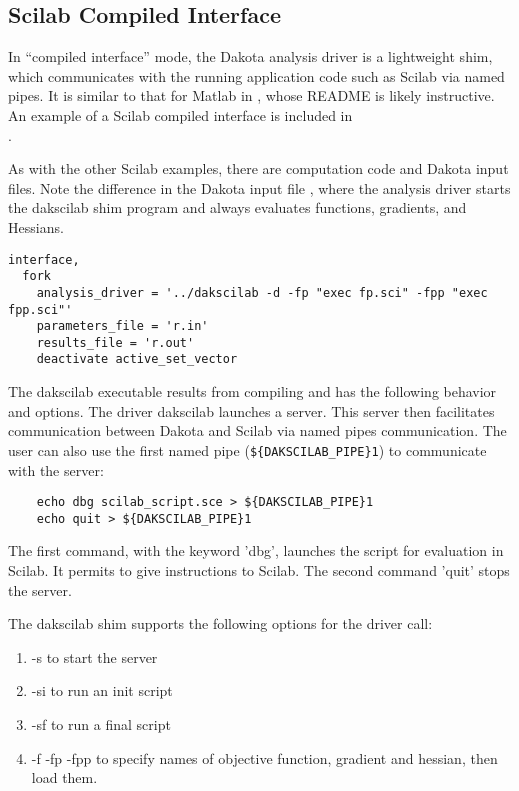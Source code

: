 \subsection{Scilab Compiled Interface} 

In ``compiled interface'' mode, the Dakota analysis driver is a
lightweight shim, which communicates with the running application code
such as Scilab via named pipes. It is similar to that for Matlab in
, whose README is likely
instructive. An example of a Scilab compiled interface is included in \\
.

As with the other Scilab examples, there are computation code and
Dakota input files. Note the difference in the Dakota input file
, where the analysis driver starts the dakscilab
shim program and always evaluates functions, gradients, and Hessians.

\begin{small}
\begin{verbatim}
interface,
  fork
    analysis_driver = '../dakscilab -d -fp "exec fp.sci" -fpp "exec fpp.sci"'
    parameters_file = 'r.in'
    results_file = 'r.out'
    deactivate active_set_vector
\end{verbatim} 
\end{small}

The dakscilab executable results from compiling 
and has the following behavior and options. The driver dakscilab
launches a server. This server then facilitates communication between
Dakota and Scilab via named pipes communication. The user can also use
the first named pipe (\texttt{\$\{DAKSCILAB\_PIPE\}1}) to communicate
with the server:
\begin{small}
\begin{verbatim}
    echo dbg scilab_script.sce > ${DAKSCILAB_PIPE}1
    echo quit > ${DAKSCILAB_PIPE}1
\end{verbatim} 
\end{small}
The first command, with the keyword 'dbg', launches the script
 for evaluation in Scilab. It permits to give
instructions to Scilab. The second command 'quit' stops the server.

The dakscilab shim supports the following options for the driver call:
\begin{enumerate}
  \item -s  to start the server
  \item -si to run an init script
  \item -sf to run a final script
  \item -f -fp -fpp to specify names of objective function, gradient
    and hessian, then load them.
\end{enumerate}

